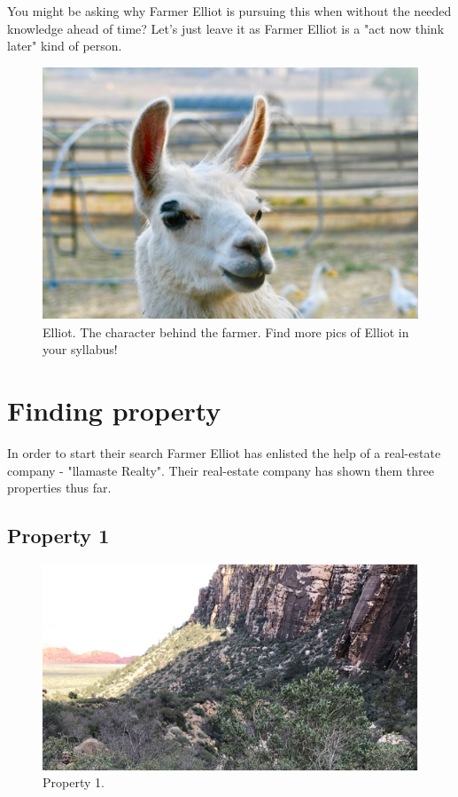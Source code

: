 \documentclass[
]{book}
\begin{document}
You might be asking why Farmer Elliot is pursuing this when without the needed knowledge ahead of time? Let's just leave it as Farmer Elliot is a "act now think later" kind of person.

\begin{figure}
\centering
\includegraphics{images/img-2.png}
\caption{Elliot. The character behind the farmer. Find more pics of Elliot in your syllabus!}
\end{figure}

\hypertarget{finding-property}{%
\section*{Finding property}\label{finding-property}}

In order to start their search Farmer Elliot has enlisted the help of a real-estate company - "llamaste Realty". Their real-estate company has shown them three properties thus far.

\hypertarget{property-1}{%
\subsection*{Property 1}\label{property-1}}

\begin{figure}
\centering
\includegraphics{images/prop-1.png}
\caption{Property 1.}
\end{figure}
\end{document}
